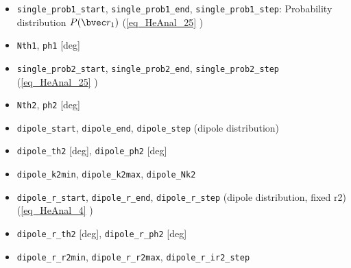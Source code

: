 \begin{itemize}
\item \verb`single_prob1_start`, \verb`single_prob1_end`, \verb`single_prob1_step`: Probability distribution $P(\bvec r_1)$ (\autoref{eq_HeAnal_25} )
\item \verb`Nth1`, \verb`ph1` [deg]

\item \verb`single_prob2_start`, \verb`single_prob2_end`, \verb`single_prob2_step` (\autoref{eq_HeAnal_25} )
\item \verb`Nth2`, \verb`ph2` [deg]

\item \verb`dipole_start`, \verb`dipole_end`, \verb`dipole_step` (dipole distribution)
\item \verb`dipole_th2` [deg], \verb`dipole_ph2` [deg]
\item \verb`dipole_k2min`, \verb`dipole_k2max`, \verb`dipole_Nk2`

\item \verb`dipole_r_start`, \verb`dipole_r_end`, \verb`dipole_r_step` (dipole distribution, fixed r2) (\autoref{eq_HeAnal_4} )
\item \verb`dipole_r_th2` [deg], \verb`dipole_r_ph2` [deg]
\item \verb`dipole_r_r2min`, \verb`dipole_r_r2max`, \verb`dipole_r_ir2_step`
\end{itemize}
